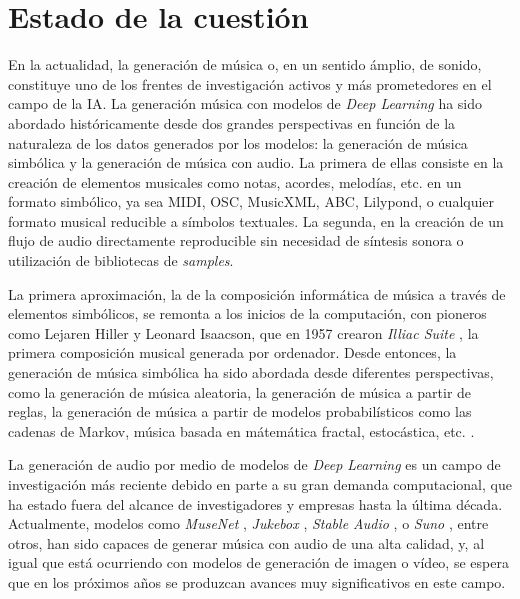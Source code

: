 \chapter{Estado de la cuestión}
\label{chap:estado_cuestion}

En la actualidad, la generación de música o, en un sentido ámplio, de sonido, constituye uno de los frentes de investigación activos y más prometedores en el campo de la IA. La generación música con modelos de \textit{Deep Learning} ha sido abordado históricamente desde dos grandes perspectivas en función de la naturaleza de los datos generados por los modelos: la generación de música simbólica y la generación de música con audio. La primera de ellas consiste en la creación de elementos musicales como notas, acordes, melodías, etc. en un formato simbólico, ya sea MIDI, OSC, MusicXML, ABC, Lilypond, o cualquier formato musical reducible a símbolos textuales. La segunda, en la creación de un flujo de audio directamente reproducible sin necesidad de síntesis sonora o utilización de bibliotecas de \textit{samples}.

La primera aproximación, la de la composición informática de música a través de elementos simbólicos, se remonta a los inicios de la computación, con pioneros como Lejaren Hiller y Leonard Isaacson, que en 1957 crearon \textit{Illiac Suite} \cite{arizaTwoPioneeringProjects2011}, la primera composición musical generada por ordenador. Desde entonces, la generación de música simbólica ha sido abordada desde diferentes perspectivas, como la generación de música aleatoria, la generación de música a partir de reglas, la generación de música a partir de modelos probabilísticos como las cadenas de Markov, música basada en mátemática fractal, estocástica, etc. \cite{hernandez-olivanSurveyArtificialIntelligence2022}. 


La generación de audio por medio de modelos de \textit{Deep Learning} es un campo de investigación más reciente debido en parte a su gran demanda computacional, que ha estado fuera del alcance de investigadores y empresas hasta la última década. Actualmente, modelos como \textit{MuseNet}  \cite{departmentofcomputersciencesrminstituteofscienceandtechnologychennaiindia.MusenetMusicGeneration2020a}, \textit{Jukebox} \cite{dhariwalJukeboxGenerativeModel2020}, \textit{Stable Audio} \cite{StableAudioFast}, o \textit{Suno} \cite{SunoAI}, entre otros, han sido capaces de generar música con audio de una alta calidad, y, al igual que está ocurriendo con modelos de generación de imagen o vídeo, se espera que en los próximos años se produzcan avances muy significativos en este campo.

